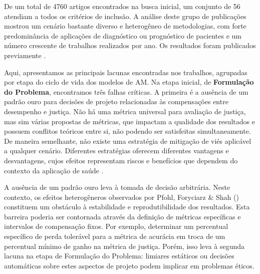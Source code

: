De um total de 4760 artigos encontrados na busca inicial, um conjunto de 56 atendiam a todos os critérios de inclusão. A análise deste grupo de publicações mostrou um cenário bastante diverso e heterogêneo de metodologias, com forte predominância de aplicações de diagnóstico ou prognóstico de pacientes e um número crescente de trabalhos realizados por ano. Os resultados foram publicados previamente
\cite{de2025justicca}.

Aqui, apresentamos as principais lacunas encontradas nos trabalhos, agrupadas por etapa do ciclo de vida dos modelos de AM. Na etapa inicial, de \textbf{Formulação do Problema}, encontramos três falhas críticas. A primeira é a ausência de um padrão ouro para decisões de projeto relacionadas às compensações entre desempenho e justiça. Não há uma métrica universal para avaliação de justiça, mas sim várias propostas de métricas, que impactam a qualidade dos resultados e possuem conflitos teóricos entre si, não podendo ser satisfeitas simultaneamente. De maneira semelhante, não existe uma estratégia de mitigação de viés aplicável a qualquer cenário. Diferentes estratégias oferecem diferentes vantagens e desvantagens, cujos efeitos representam riscos e benefícios que dependem do contexto da aplicação de saúde  \cite{alday2022age,mosteiro2022bias,park2021comparison,yuan2021assessing}.

A ausência de um padrão ouro leva à tomada de decisão arbitrária. Neste contexto, os efeitos heterogêneros observados por Pfohl, Foryciarz \& Shah (\citeyear{pfohl2021empirical}) constituem um obstáculo à estabilidade e reprodutibilidade dos resultados. Esta barreira poderia ser contornada através da definição de métricas específicas e intervalos de compensação fixos. Por exemplo, determinar um percentual específico de perda tolerável para a métrica de acurácia em troca de um percentual mínimo de ganho na métrica de justiça. Porém, isso leva à segunda lacuna na etapa de Formulação do Problema: limiares estáticos ou decisões automáticas sobre estes aspectos de projeto podem implicar em problemas éticos.

